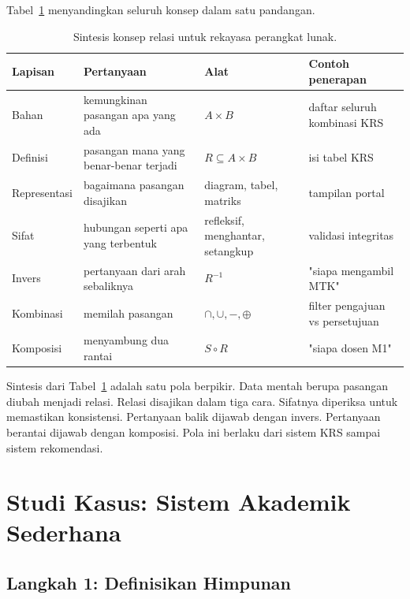 \documentclass[11pt,a4paper]{article}
\begin{document}
Tabel~\ref{tab:sintesis} menyandingkan seluruh konsep dalam satu pandangan.

\begin{table}[H]
	\centering
	\caption{Sintesis konsep relasi untuk rekayasa perangkat lunak.}
	\label{tab:sintesis}
	\footnotesize
	\begin{tabularx}{\textwidth}{l X X X}
		\toprule
		Lapisan      & Pertanyaan                             & Alat                             & Contoh penerapan                \\
		\midrule
		Bahan        & kemungkinan pasangan apa yang ada      & $A \times B$                     & daftar seluruh kombinasi KRS    \\
		Definisi     & pasangan mana yang benar-benar terjadi & $R \subseteq A \times B$         & isi tabel KRS                   \\
		Representasi & bagaimana pasangan disajikan           & diagram, tabel, matriks          & tampilan portal                 \\
		Sifat        & hubungan seperti apa yang terbentuk    & refleksif, menghantar, setangkup & validasi integritas             \\
		Invers       & pertanyaan dari arah sebaliknya        & $R^{-1}$                         & "siapa mengambil MTK"           \\
		Kombinasi    & memilah pasangan                       & $\cap, \cup, -, \oplus$          & filter pengajuan vs persetujuan \\
		Komposisi    & menyambung dua rantai                  & $S \circ R$                      & "siapa dosen M1"                \\
		\bottomrule
	\end{tabularx}
\end{table}

Sintesis dari Tabel~\ref{tab:sintesis} adalah satu pola berpikir. Data mentah berupa pasangan diubah menjadi relasi. Relasi disajikan dalam tiga cara. Sifatnya diperiksa untuk memastikan konsistensi. Pertanyaan balik dijawab dengan invers. Pertanyaan berantai dijawab dengan komposisi. Pola ini berlaku dari sistem KRS sampai sistem rekomendasi.

\section{Studi Kasus: Sistem Akademik Sederhana}

\subsection{Langkah 1: Definisikan Himpunan}
\end{document}
